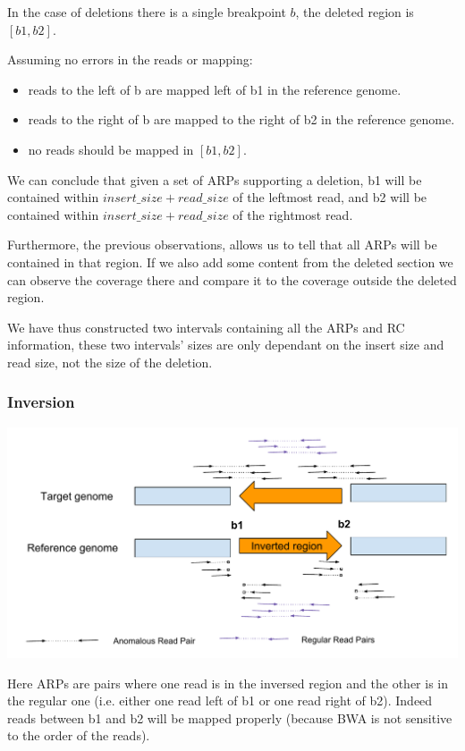 \documentclass{article}
\begin{document}
In the case of deletions there is a single breakpoint $b$, the deleted region is $[b1, b2]$.

Assuming no errors in the reads or mapping:
\begin{itemize}
    \item reads to the left of b are mapped left of b1 in the reference genome.
    \item reads to the right of b are mapped to the right of b2 in the reference genome.
    \item no reads should be mapped in $[b1, b2]$.
\end{itemize}

We can conclude that given a set of ARPs supporting a deletion, b1 will be contained within $insert\_size + read\_size$ of the leftmost read, and b2 will be contained within $insert\_size + read\_size$ of the rightmost read.

Furthermore, the previous observations, allows us to tell that all ARPs will be contained in that region. If we also add some content from the deleted section we can observe the coverage there and compare it to the coverage outside the deleted region.

We have thus constructed two intervals containing all the ARPs and RC information, these two intervals' sizes are only dependant on the insert size and read size, not the size of the deletion. 

\subsubsection{Inversion} 

\includegraphics[width=\textwidth]{InversionReadPairs}

Here ARPs are pairs where one read is in the inversed region and the other
is in the regular one (i.e. either one read left of b1 or one read right of b2). Indeed reads
between b1 and b2 will be mapped properly (because BWA is not sensitive to the order of the reads).
\end{document}
